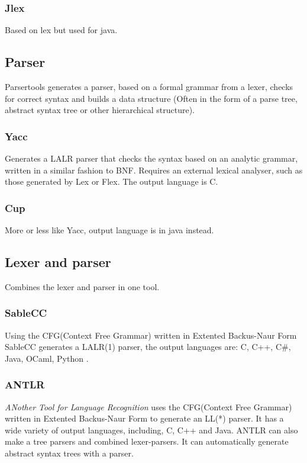 \subsubsection{Jlex}
Based on lex but used for java. \citep{Jlex}

\subsection{Parser}
Parsertools generates a parser, based on a formal grammar from a lexer, checks for correct syntax and builds a data structure (Often in the form of a parse tree, abstract syntax tree or other hierarchical structure). 

\subsubsection{Yacc}
Generates a LALR parser that checks the syntax based on an analytic grammar, written in a similar fashion to BNF. Requires an external lexical analyser, such as those generated by Lex or Flex. The output language is C. \citep{Yacc}

\subsubsection{Cup}
More or less like Yacc, output language is in java instead. \citep{CUP}

\subsection{Lexer and parser}
Combines the lexer and parser in one tool.

\subsubsection{SableCC}
Using the CFG(Context Free Grammar) written in Extented Backus-Naur Form SableCC generates a LALR(1) parser, the output languages are: C, C++, C\#, Java, OCaml, Python \citep{SableCC}.

\subsubsection{ANTLR}
\textit{ANother Tool for Language Recognition} uses the CFG(Context Free Grammar) written in Extented Backus-Naur Form to generate an LL(*) parser. It has a wide variety of output languages, including, C, C++ and Java.
ANTLR can also make a tree parsers and combined lexer-parsers. It can automatically generate abstract syntax trees with a parser. \citep{ANTLR} %


